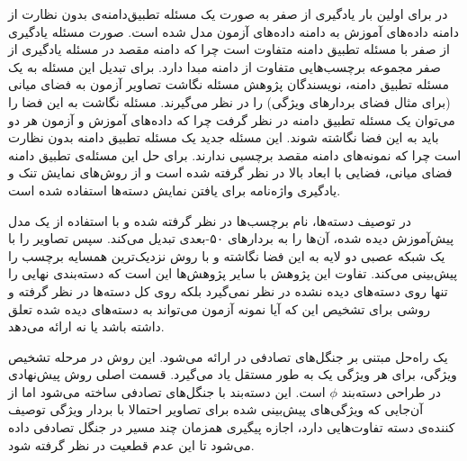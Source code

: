  در \cite{Kodirov2015} برای اولین بار یادگیری از صفر به صورت یک مسئله تطبیق‌دامنه‌ی بدون نظارت از دامنه داده‌های آموزش به دامنه داده‌های آزمون مدل شده است. صورت مسئله یادگیری از صفر با مسئله تطبیق دامنه متفاوت است چرا که دامنه مقصد در مسئله یادگیری از صفر مجموعه برچسب‌هایی متفاوت از دامنه مبدا دارد. برای تبدیل این مسئله به یک مسئله تطبیق دامنه، نویسندگان پژوهش مسئله نگاشت تصاویر آزمون به فضای میانی (برای مثال فضای بردارهای ویژگی) را در نظر می‌گیرند. مسئله نگاشت به این فضا را می‌توان یک مسئله تطبیق دامنه در نظر گرفت چرا که داده‌های آموزش و آزمون هر دو باید به این فضا نگاشته شوند. این مسئله جدید یک مسئله تطبیق دامنه بدون نظارت است چرا که نمونه‌های دامنه مقصد برچسبی ندارند. برای حل این مسئله‌ی تطبیق دامنه فضای میانی، فضایی با ابعاد بالا در نظر گرفته شده است و از روش‌های نمایش تنک 
و یادگیری واژه‌نامه برای یافتن نمایش دسته‌ها استفاده شده است. 
 
 
در \cite{ng13} توصیف دسته‌ها، نام برچسب‌ها در نظر گرفته شده و با استفاده از یک مدل پیش‌آموزش دیده شده، آن‌ها را به بردارهای ۵۰-بعدی تبدیل می‌کند. سپس تصاویر را با یک شبکه عصبی دو لایه به این فضا نگاشته و با روش نزدیک‌ترین همسایه برچسب را پیش‌بینی می‌کند. تفاوت این پژوهش با سایر پژوهش‌ها این است که دسته‌بندی نهایی را تنها روی دسته‌های دیده نشده در نظر نمی‌گیرد بلکه روی کل دسته‌ها در نظر گرفته و روشی برای تشخیص این که آیا نمونه آزمون می‌تواند به دسته‌های دیده شده تعلق داشته باشد یا نه ارائه می‌دهد.

یک راه‌حل مبتنی بر جنگل‌های تصادفی  در \cite{ jayaraman14} ارائه می‌شود. این روش در مرحله تشخیص ویژگی، برای هر ویژگی یک   به طور مستقل یاد می‌گیرد. قسمت اصلی روش پیش‌نهادی در طراحی دسته‌بند $\phi$ است. این دسته‌بند با جنگل‌های تصادفی ساخته می‌شود اما از آن‌جایی که ویژگی‌های پیش‌بینی شده برای تصاویر احتمالا با بردار ویژگی توصیف کننده‌ی دسته تفاوت‌هایی دارد، اجازه پیگیری همزمان چند مسیر در جنگل تصادفی داده می‌شود تا این عدم قطعیت در نظر گرفته شود. 




 

